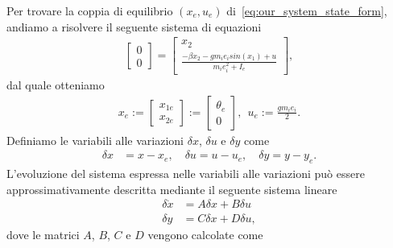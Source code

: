 \documentclass[a4paper, 11pt]{article}
\begin{document}
%
Per trovare la coppia di equilibrio $(x_e, u_e)$ di~\eqref{eq:our_system_state_form}, andiamo a risolvere il seguente sistema di equazioni
%
\begin{align}
	\begin{bmatrix} 
        0
        \\
        0
        \end{bmatrix} = 
        \begin{bmatrix}
        x_2
        \\ 
        \frac{-\beta x_2-g m_i e_i sin(x_1)+ u}{m_i e_i^2 + I_e} 
        \end{bmatrix} ,
\end{align}
%
dal quale otteniamo
%
\begin{align}
	x_e := \begin{bmatrix} x_{1e}
                \\ 
                x_{2e}
                \end{bmatrix} :=
                \begin{bmatrix} 
                \theta_e 
                \\ 
                0
                \end{bmatrix}, \ \
u_e:= \frac{g m_i e_i}{2}.\label{eq:equilibirum_pair}
\end{align}
%
Definiamo le variabili alle variazioni $\delta x$, $\delta u$ e $\delta y$ come 
%
\begin{align*}
	\delta x &= x - x_e, 
	\quad
	\delta u = u - u_e, 
	\quad
	\delta y = y - y_e.
\end{align*}
%
L'evoluzione del sistema espressa nelle variabili alle variazioni pu\`o essere approssimativamente descritta mediante il seguente sistema lineare
%
\begin{subequations}\label{eq:linearized_system}
\begin{align}
	\delta \dot{x} &= A\delta x + B\delta u
	\\
	\delta y &= C\delta x + D\delta u,
\end{align}
\end{subequations}
%
dove le matrici $A$, $B$, $C$ e $D$ vengono calcolate come
%
\end{document}
